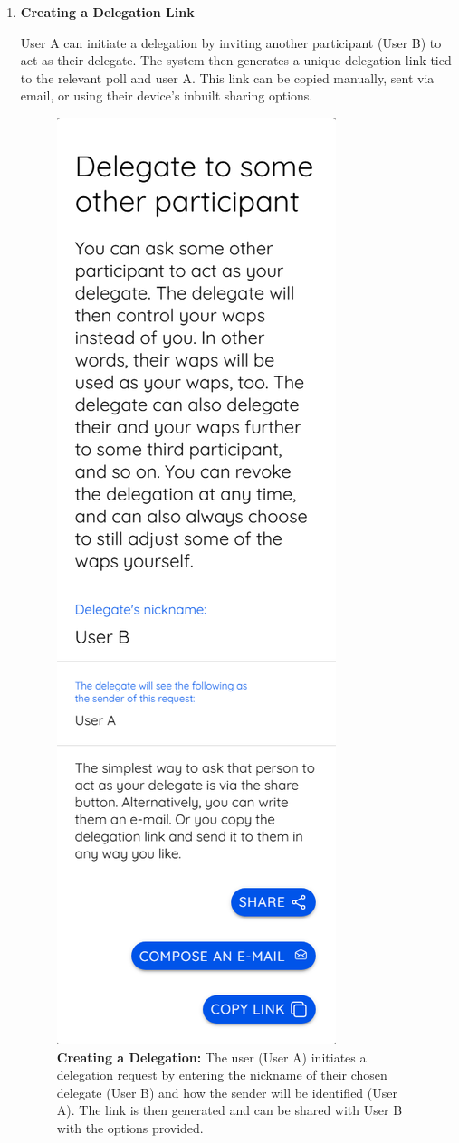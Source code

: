 \begin{enumerate}

\item \textbf{Creating a Delegation Link}

User A can initiate a delegation by inviting another participant (User B) to act as their delegate. The system then generates a unique delegation link tied to the relevant poll and user A. This link can be copied manually, sent via email, or using their device's inbuilt sharing options.

\begin{figure}[H]
    \centering
    \includegraphics[width=0.2\linewidth]{../common/initial_vodle_screenshots/deldialog.png}
    \caption{\textbf{Creating a Delegation:} The user (User A) initiates a delegation request by entering the nickname of their chosen delegate (User B) and how the sender will be identified (User A). The link is then generated and can be shared with User B with the options provided.}
    \label{fig:deldialog_initial}
\end{figure}



\end{enumerate}
